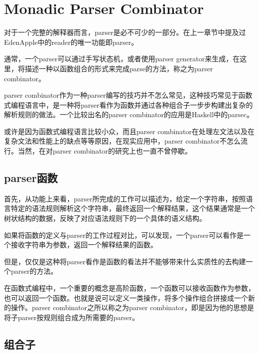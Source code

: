%
%


\newcommand{\hsbind}[0]{$>\!\!>\!\!=$}
\newcommand{\hschoice}[0]{$<\!\!|\!\!>$}

\chapter{Monadic Parser Combinator}

对于一个完整的解释器而言，parser是必不可少的一部分。在上一章节中提及过EdenApple中的reader的唯一功能即parser。

通常，一个parser可以通过手写状态机，或者使用parser generator来生成，在这里，将描述一种以函数组合的形式来完成parse的方法，称之为parser combinator。

parser combinator作为一种parser编写的技巧并不怎么常见，这种技巧常见于函数式编程语言中，是一种将parser看作为函数并通过各种组合子一步步构建出复杂的解析规则的做法。一个比较出名的parser combinator的应用是Haskell中的parsec\cite{leijen01parsec}。

或许是因为函数式编程语言比较小众，而且parser combinator在处理左文法以及在复杂文法和性能上的缺点等等原因，在现实应用中，parser combinator不怎么流行。当然，在对parser combinator的研究上也一直不曾停歇。

\section{parser函数}

首先，从功能上来看，parser所完成的工作可以描述为，给定一个字符串，按照语言特定的语法规则解析这个字符串，最终返回一个解释结果，这个结果通常是一个树状结构的数据，反映了对应语法规则下的一个具体的语义结构。

如果将函数的定义与parser的工作过程对比，可以发现，一个parser可以看作是一个接收字符串为参数，返回一个解释结果的函数。

但是，仅仅是这种将parser看作是函数的看法并不能够带来什么实质性的去构建一个parser的方法。

在函数式编程中，一个重要的概念是高阶函数，一个函数可以接收函数作为参数，也可以返回一个函数。也就是说可以定义一类操作，将多个操作组合拼接成一个新的操作。parser combinator之所以称之为parser combinator，即是因为他的思想是将子parser按规则组合成为所需要的parser。

\section{组合子}

